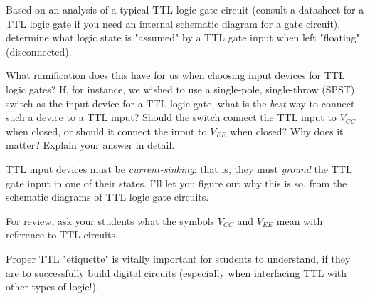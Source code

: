

Based on an analysis of a typical TTL logic gate circuit (consult a datasheet for a TTL logic gate if you need an internal schematic diagram for a gate circuit), determine what logic state is "assumed" by a TTL gate input when left "floating" (disconnected).

What ramification does this have for us when choosing input devices for TTL logic gates?  If, for instance, we wished to use a single-pole, single-throw (SPST) switch as the input device for a TTL logic gate, what is the {\it best} way to connect such a device to a TTL input?  Should the switch connect the TTL input to $V_{CC}$ when closed, or should it connect the input to $V_{EE}$ when closed?  Why does it matter?  Explain your answer in detail.







TTL input devices must be {\it current-sinking}: that is, they must {\it ground} the TTL gate input in one of their states.  I'll let you figure out why this is so, from the schematic diagrams of TTL logic gate circuits.







For review, ask your students what the symbols $V_{CC}$ and $V_{EE}$ mean with reference to TTL circuits.

Proper TTL "etiquette" is vitally important for students to understand, if they are to successfully build digital circuits (especially when interfacing TTL with other types of logic!).




